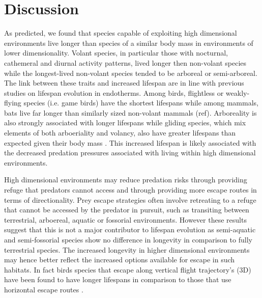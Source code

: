 \section{Discussion}

As predicted, we found that species capable of exploiting high dimensional environments live longer than species of a similar body mass in environments of lower dimensionality. Volant species, in particular those with nocturnal, cathemeral and diurnal activity patterns, lived longer then non-volant species while the longest-lived non-volant species tended to be arboreal or semi-arboreal. The link between these traits and increased lifespan are in line with previous studies on lifespan evolution in endotherms. Among birds, flightless or weakly-flying species (i.e. game birds) have the shortest lifespans \citep{ricklefs2010life,Williams1957,wilkinson2002life} while among mammals, bats live far longer than similarly sized non-volant mammals (ref). Arboreality is also strongly associated with longer lifespans \citep{shattuck2010arboreality} while gliding species, which mix elements of both arboeriality and volancy, also have greater lifespans than expected given their body mass \citep{holmes1994fly}. This increased lifespan is likely associated with the decreased predation pressures associated with living within high dimensional environments.


High dimensional environments may reduce predation risks through providing refuge that predators cannot access and through providing more escape routes in terms of directionality. Prey escape strategies often involve retreating to a refuge that cannot be accessed by the predator in pursuit, such as transiting between terrestrial, arboereal, aquatic or fossorial environments. However these results suggest that this is not a major contributor to lifespan evolution as semi-aquatic and semi-fossorial species show no difference in longevity in comparison to fully terrestrial species. The increased longevity in higher dimensional environments may hence better reflect the increased options available for escape in such habitats. In fact birds species that escape along vertical flight trajectory's (3D) have been found to have longer lifespans in comparison to those that use horizontal escape routes \citep{moller2010up}. 


